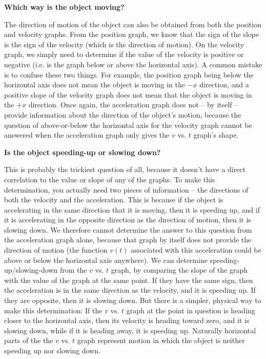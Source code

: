\documentclass[12pt,addpoints]{exam}
\begin{document}
    \begin{center}
    	\textbf{Which way is the object moving?}
    \end{center}
    The direction of motion of the object can also be obtained from both the position and velocity graphs. From the position graph, we know that the sign of the slope is the sign of the velocity (which is the direction of motion). On the velocity graph, we simply need to determine if the value of the velocity is positive or negative (i.e. is the graph below or above the horizontal axis). A common mistake is to confuse these two things. For example, the position graph being below the horizontal axis does not mean the object is moving in the $-x$ direction, and a positive slope of the velocity graph does not mean that the object is moving in the $+x$
    direction. Once again, the acceleration graph does not – by itself – provide information about the direction of the object's motion, because the question of above-or-below the horizontal axis for the velocity graph cannot be answered when the acceleration graph only gives the $v$ vs. $t$ graph's shape.
    \begin{center}
    	\textbf{Is the object speeding-up or slowing down?}
    \end{center}
	This is probably the trickiest question of all, because it doesn't have a direct correlation to the value or slope of any of the graphs. To make this determination, you actually need two pieces of information – the directions of both the velocity and the acceleration. This is because if the object is accelerating in the same direction that it is moving, then it is speeding up, and if it is accelerating in the opposite direction as the direction of motion, then it is slowing down. We therefore cannot determine the answer to this question from the acceleration graph alone, because that graph by itself does not provide the direction of motion (the function  $v(t)$
	associated with this acceleration could be above or below the horizontal axis anywhere). We can determine speeding-up/slowing-down from the $v$ vs. $t$ graph, by comparing the slope of the graph with the value of the graph at the same point. If they have the same sign, then the acceleration is in the same direction as the velocity, and it is speeding up. If they are opposite, then it is slowing down. But there is a simpler, physical way to make this determination: If the $v$ vs. $t$ graph at the point in question is heading closer to the horizontal axis, then its velocity is heading toward zero, and it is slowing down, while if it is heading away, it is speeding up. Naturally horizontal parts of the the $v$ vs. $t$ graph represent motion in which the object is neither speeding up nor slowing down.\\ \\
\end{document}

